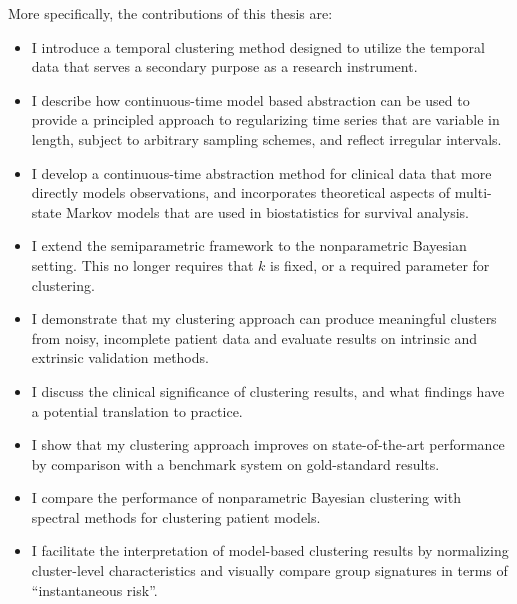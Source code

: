 




More specifically, the contributions of this thesis are:
\begin{itemize}
  \item I introduce a temporal clustering method designed to utilize the temporal data that serves a secondary purpose as a research instrument.
  \item I describe how continuous-time model based abstraction can be used to provide a principled approach to regularizing time series that are variable in length, subject to arbitrary sampling schemes, and reflect irregular intervals.
  \item I develop a continuous-time abstraction method for clinical data that more directly models observations, and incorporates theoretical aspects of multi-state Markov models that are used in biostatistics for survival analysis.
  \item I extend the semiparametric framework to the nonparametric Bayesian setting.  This no longer requires that $k$ is fixed, or a required parameter for clustering.
  \item I demonstrate that my clustering approach can produce meaningful clusters from noisy, incomplete patient data and evaluate results on intrinsic and extrinsic validation methods.
  \item I discuss the clinical significance of clustering results, and what findings have a potential translation to practice.
  \item I show that my clustering approach improves on state-of-the-art performance by comparison with a benchmark system on gold-standard results.
  \item I compare the performance of nonparametric Bayesian clustering with spectral methods for clustering patient models.
  \item I facilitate the interpretation of model-based clustering results by normalizing cluster-level characteristics and visually compare group signatures in terms of ``instantaneous risk''.
\end{itemize}


